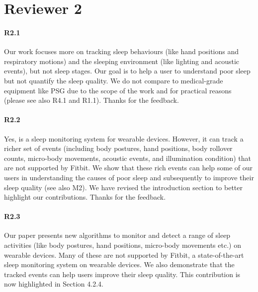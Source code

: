 \section*{Reviewer 2}
\paragraph{R2.1} Our work focuses more on tracking sleep behaviours (like hand positions and respiratory motions) and the sleeping environment (like lighting and acoustic events), but not sleep stages. Our goal is to help a user to understand poor sleep but not quantify the sleep quality. We do not compare to medical-grade equipment like PSG due to the scope of the work and for practical reasons (please see also R4.1 and R1.1). Thanks for the feedback.


\paragraph{R2.2} Yes, \systemname is a sleep monitoring system for wearable devices. However, it can track a richer set of events
(including body postures, hand positions, body rollover counts, micro-body movements, acoustic events, and illumination condition) that are not supported by Fitbit. We show that these rich events can help some of our users in understanding the causes of poor sleep and subsequently to improve
their sleep quality (see also M2). We have revised the introduction section to better highlight our contributions. Thanks for the feedback.

\paragraph{R2.3} Our paper presents new algorithms to monitor and detect a range of sleep activities (like body postures, hand positions,
micro-body movements etc.) on wearable devices. Many of these are not supported by Fitbit, a state-of-the-art sleep monitoring system on
wearable devices. We also demonstrate that the tracked events can help users improve their sleep quality. This contribution is now
highlighted in Section 4.2.4.
